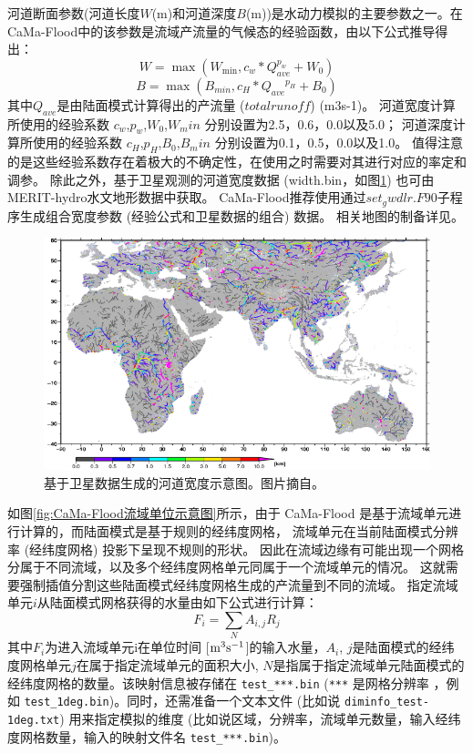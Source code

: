 河道断面参数(河道长度$W$(m)和河道深度$ B$(m))是水动力模拟的主要参数之一。在CaMa-Flood中的该参数是流域产流量的气候态的经验函数，由以下公式推导得出：
\begin{equation}
W=\max \left(W_{\min }, c_{w} * Q_{a v e}^{p_{w}}+W_{0}\right)
\end{equation}
\begin{equation}
B=\max \left(B_{ {min }}, c_{H} * Q_{ {ave }}{ }^{p_{H}}+B_{0}\right)
\end{equation}
其中$Q_{ave}$是由陆面模式计算得出的产流量 ($total runoff$) (m3s-1)。
河道宽度计算所使用的经验系数 $c_w$,$p_w$,$W_0$,$W_min$ 分别设置为2.5，0.6，0.0以及5.0；
河道深度计算所使用的经验系数 $c_H$,$p_H$,$B_0$,$B_min$ 分别设置为0.1，0.5，0.0以及1.0。
值得注意的是这些经验系数存在着极大的不确定性，在使用之时需要对其进行对应的率定和调参。
除此之外，基于卫星观测的河道宽度数据 (width.bin，如图\ref{fig:基于卫星数据生成的河道宽度示意图}) 也可由MERIT-hydro水文地形数据中获取。
CaMa-Flood推荐使用通过$set_gwdlr.F90$子程序生成组合宽度参数 (经验公式和卫星数据的组合) 数据。
相关地图的制备详见\citet{yamazaki2014development,yamazaki2014regional}。
{
\begin{figure}[]
\centering
\includegraphics{Figures/陆地表面的水分循环/基于卫星数据生成的河道宽度示意图.png}
\caption{基于卫星数据生成的河道宽度示意图。图片摘自\citet{yamazaki2011physically}。}
\label{fig:基于卫星数据生成的河道宽度示意图}
\end{figure}
}


如图\ref{fig:CaMa-Flood流域单位示意图}所示，由于 CaMa-Flood 是基于流域单元进行计算的，而陆面模式是基于规则的经纬度网格，
流域单元在当前陆面模式分辨率 (经纬度网格) 投影下呈现不规则的形状。
因此在流域边缘有可能出现一个网格分属于不同流域，以及多个经纬度网格单元同属于一个流域单元的情况。
这就需要强制插值分割这些陆面模式经纬度网格生成的产流量到不同的流域。
指定流域单元$i$从陆面模式网格获得的水量由如下公式进行计算：
\begin{equation}
F_{i}=\sum_{N} A_{i, j} R_{j}
\end{equation}
其中$F_i$为进入流域单元i在单位时间 [$\rm m^3s^{-1}$]的输入水量，$A_i$, $j$是陆面模式的经纬度网格单元$j$在属于指定流域单元的面积大小,
 $N$是指属于指定流域单元陆面模式的经纬度网格的数量。该映射信息被存储在 \texttt{test\_***.bin} (\texttt{***} 是网格分辨率
 ，例如 \texttt{test\_1deg.bin})。同时，还需准备一个文本文件 (比如说 \texttt{diminfo\_test-1deg.txt}) 用来指定模拟的维度
  (比如说区域，分辨率，流域单元数量，输入经纬度网格数量，输入的映射文件名 \texttt{test\_***.bin})。

